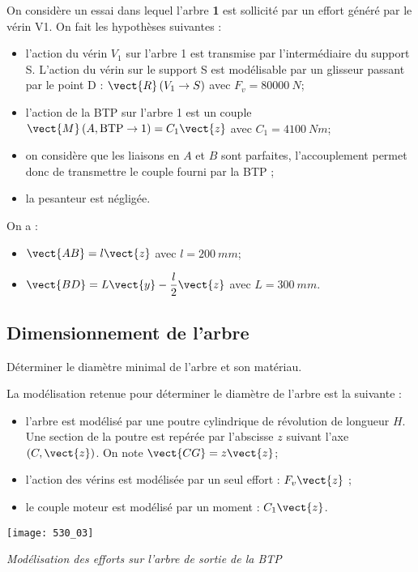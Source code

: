 On considère un essai dans lequel l’arbre \textbf{1} est sollicité par un effort généré par le vérin V1. On fait les hypothèses suivantes :
\begin{itemize}
\item l’action du vérin $V_1$ sur l’arbre 1 est transmise par l’intermédiaire du support S. L’action du vérin sur le support S est modélisable par un glisseur passant par le point D : $\vect{R}\left( V_1\to S\right)$ avec $F_v=\SI{80 000}{N}$;
\item l’action de la BTP sur l’arbre 1 est un couple $\vect{M}\left(A,\text{BTP}\to 1 \right)=C_1 \vect{z}$ avec $C_1=\SI{4 100}{Nm}$;
\item on considère que les liaisons en $A$ et $B$ sont parfaites, l’accouplement permet donc de transmettre le couple fourni par la BTP ;
\item la pesanteur est négligée.
\end{itemize}
On a :
\begin{itemize}
\item $\vect{AB}=l\vect{z}$ avec $l=\SI{200}{mm}$;
\item $\vect{BD}=L\vect{y}-\dfrac{l}{2}\vect{z}$ avec $L=\SI{300}{mm}$.
\end{itemize}

\subsection*{Dimensionnement de l’arbre}
\begin{obj}	Déterminer le diamètre minimal de l’arbre et son matériau.
\end{obj}

La modélisation retenue pour déterminer le diamètre de l’arbre est la suivante  :
\begin{itemize}
\item l’arbre est modélisé par une poutre cylindrique de révolution de longueur $H$. Une section de la poutre est repérée par l’abscisse $z$ suivant l’axe $(C,\vect{z})$. On note $\vect{CG}=z\vect{z}$;
\item l’action des vérins est modélisée par un seul effort : $F_v \vect{z}$ ;
\item le couple moteur est modélisé par un moment : $C_1\vect{z}$.
\end{itemize} 

\begin{center}
\texttt{[image: 530\_03]}

\textit{Modélisation des efforts sur l’arbre de sortie de la BTP}
\end{center}

